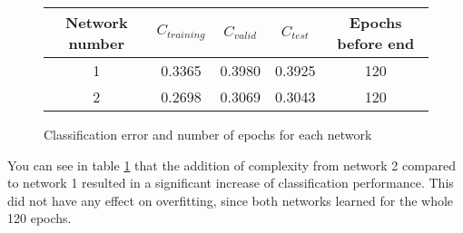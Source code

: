 \documentclass[12pt,A4]{article}
\begin{document}
\parindent=0cm

\begin{figure}

\begin{center}
\begin{tabular}{|| c c c c c||}
\hline
Network number & $C_{training}$ &$C_{valid}$ & $C_{test}$& Epochs before end\\[0.5ex]
\hline \hline
1 & 0.3365 & 0.3980 & 0.3925 & 120\\
\hline
2 & 0.2698 & 0.3069 & 0.3043 & 120\\ [1ex]
\hline

\end{tabular}
\end{center}
\caption{Classification error and number of epochs for each network\label{tab}}
\end{figure}
You can see in table \ref{tab} that the addition of complexity from network 2 compared to network 1 resulted in a significant increase of classification performance. This did not have any effect on overfitting, since both networks learned for the whole 120 epochs.
\end{document}
